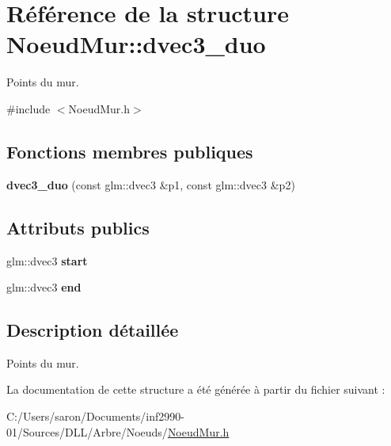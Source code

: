 \hypertarget{struct_noeud_mur_1_1dvec3__duo}{\section{Référence de la structure Noeud\-Mur\-:\-:dvec3\-\_\-duo}
\label{struct_noeud_mur_1_1dvec3__duo}
}


Points du mur.  




{\ttfamily \#include $<$Noeud\-Mur.\-h$>$}

\subsection*{Fonctions membres publiques}
\begin{DoxyCompactItemize}
\item 
\hypertarget{struct_noeud_mur_1_1dvec3__duo_ad463f5add9aebd2a17216d6d6263f275}{{\bfseries dvec3\-\_\-duo} (const glm\-::dvec3 \&p1, const glm\-::dvec3 \&p2)}\label{struct_noeud_mur_1_1dvec3__duo_ad463f5add9aebd2a17216d6d6263f275}

\end{DoxyCompactItemize}
\subsection*{Attributs publics}
\begin{DoxyCompactItemize}
\item 
\hypertarget{struct_noeud_mur_1_1dvec3__duo_aa8b3e1732fd2557fedfe7654e831da99}{glm\-::dvec3 {\bfseries start}}\label{struct_noeud_mur_1_1dvec3__duo_aa8b3e1732fd2557fedfe7654e831da99}

\item 
\hypertarget{struct_noeud_mur_1_1dvec3__duo_a773c7fee621b9ce041792ee7b9e4b9e8}{glm\-::dvec3 {\bfseries end}}\label{struct_noeud_mur_1_1dvec3__duo_a773c7fee621b9ce041792ee7b9e4b9e8}

\end{DoxyCompactItemize}


\subsection{Description détaillée}
Points du mur. 

La documentation de cette structure a été générée à partir du fichier suivant \-:\begin{DoxyCompactItemize}
\item 
C\-:/\-Users/saron/\-Documents/inf2990-\/01/\-Sources/\-D\-L\-L/\-Arbre/\-Noeuds/\hyperlink{_noeud_mur_8h}{Noeud\-Mur.\-h}\end{DoxyCompactItemize}

